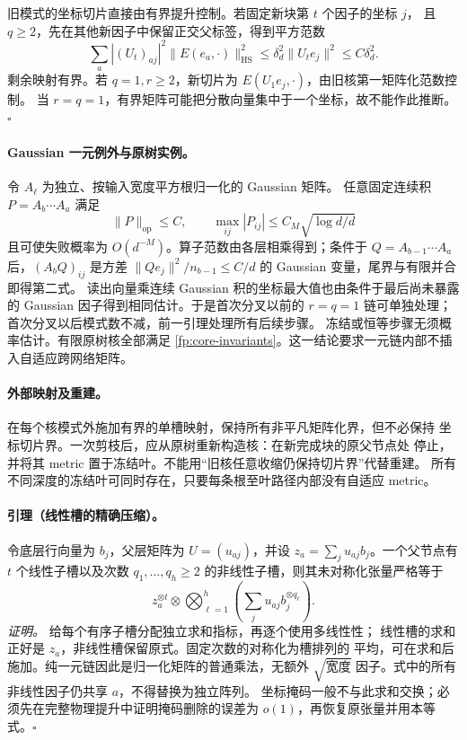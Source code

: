 \documentclass[a4paper]{tufte-handout}
\begin{document}
\begin{fullwidth}
旧模式的坐标切片直接由有界提升控制。若固定新块第 $t$ 个因子的坐标 $j$，
且 $q\geq2$，先在其他新因子中保留正交父标签，得到平方范数
\[
 \sum_a |(U_t)_{aj}|^2\|E(e_a,\cdot)\|_{\mathrm{HS}}^2
 \leq\delta_d^2\|U_te_j\|^2\leq C\delta_d^2.
\]
剩余映射有界。若 $q=1,r\geq2$，新切片为
$E(U_1e_j,\cdot)$，由旧核第一矩阵化范数控制。
当 $r=q=1$，有界矩阵可能把分散向量集中于一个坐标，故不能作此推断。
\hfill$\square$

\paragraph{Gaussian 一元例外与原树实例。}
令 $A_\ell$ 为独立、按输入宽度平方根归一化的 Gaussian 矩阵。
任意固定连续积 $P=A_b\cdots A_a$ 满足
\begin{equation}
 \|P\|_{\mathrm{op}}\leq C,\qquad
 \max_{ij}|P_{ij}|\leq C_M\sqrt{\log d/d}
 \label{fp:core-product-event}
\end{equation}
且可使失败概率为 $O(d^{-M})$。算子范数由各层相乘得到；条件于
$Q=A_{b-1}\cdots A_a$ 后，$(A_bQ)_{ij}$ 是方差
$\|Qe_j\|^2/n_{b-1}\leq C/d$ 的 Gaussian 变量，尾界与有限并合即得第二式。
读出向量乘连续 Gaussian 积的坐标最大值也由条件于最后尚未暴露的
Gaussian 因子得到相同估计。于是首次分叉以前的 $r=q=1$ 链可单独处理；
首次分叉以后模式数不减，前一引理处理所有后续步骤。
冻结或恒等步骤无须概率估计。有限原树核全部满足
\eqref{fp:core-invariants}。这一结论要求一元链内部不插入自适应跨网络矩阵。

\paragraph{外部映射及重建。}
在每个核模式外施加有界的单槽映射，保持所有非平凡矩阵化界，但不必保持
坐标切片界。一次剪枝后，应从原树重新构造核：在新完成块的原父节点处
停止，并将其 metric 置于冻结叶。不能用“旧核任意收缩仍保持切片界”代替重建。
所有不同深度的冻结叶可同时存在，只要每条根至叶路径内部没有自适应 metric。

\paragraph{引理（线性槽的精确压缩）。}
\label{fp:core-linear}
令底层行向量为 $b_j$，父层矩阵为 $U=(u_{aj})$，并设
$z_a=\sum_ju_{aj}b_j$。一个父节点有 $t$ 个线性子槽以及次数
$q_1,\ldots,q_h\geq2$ 的非线性子槽，则其未对称化张量严格等于
\begin{equation}
 z_a^{\otimes t}\otimes
 \bigotimes_{\ell=1}^h\left(\sum_j u_{aj}b_j^{\otimes q_\ell}\right).
 \label{fp:core-linear-identity}
\end{equation}
\emph{证明。} 给每个有序子槽分配独立求和指标，再逐个使用多线性性；
线性槽的求和正好是 $z_a$，非线性槽保留原式。固定次数的对称化为槽排列的
平均，可在求和后施加。纯一元链因此是归一化矩阵的普通乘法，无额外
$\sqrt{\text{宽度}}$ 因子。式中的所有非线性因子仍共享 $a$，不得替换为独立阵列。
坐标掩码一般不与此求和交换；必须先在完整物理提升中证明掩码删除的误差为
$o(1)$，再恢复原张量并用本等式。\hfill$\square$


\end{fullwidth}
\end{document}
